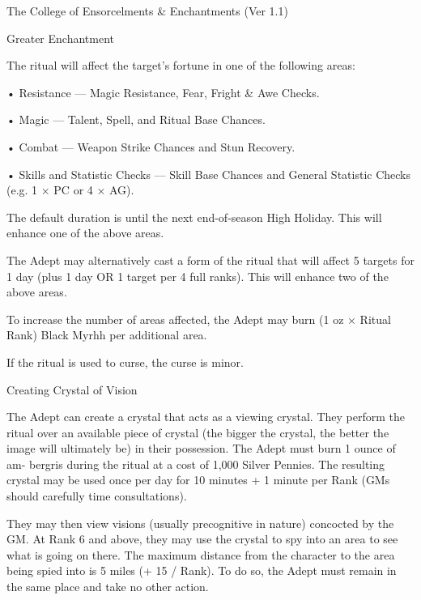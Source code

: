 \begin{Chapter}{The College of Ensorcelments \& Enchantments (Ver 1.1)}
\begin{ritual}[Q-1]{Greater Enchantment}
\begin{effects}
The ritual will affect the target’s fortune in one of 
the following areas:  

•  Resistance  —  Magic  Resistance,  Fear,  Fright  \& 
Awe Checks.  

• Magic — Talent, Spell, and Ritual Base Chances.  

•  Combat  —  Weapon  Strike  Chances  and  Stun 
Recovery.  

• Skills and Statistic Checks — Skill Base Chances 
and  General  Statistic  Checks  (e.g.  1  ×  PC  or  4  × 
AG). 

The default duration is until the next end-of-season High Holiday.
This will enhance one of the above areas.

The Adept may alternatively cast a form of the ritual that will affect
5 targets for 1 day (plus 1 day OR 1 target per 4 full ranks).  This
will enhance two of the above areas.

To increase the number of areas affected, the Adept may burn (1 oz ×
Ritual Rank) Black Myrhh per additional area.

If the ritual is used to curse, the curse is minor.
\end{effects}
\end{ritual}

\begin{ritual}[Q-2]{Creating Crystal of Vision }

\begin{effects}
The Adept can create a crystal that acts as a viewing crystal.  They
perform the ritual over an available piece of crystal (the bigger the
crystal, the better the image will ultimately be) in their possession.
The Adept must burn 1 ounce of am- bergris during the ritual at a cost
of 1,000 Silver Pennies.  The resulting crystal may be used once per
day for 10 minutes + 1 minute per Rank (GMs should carefully time
consultations).

They may then view visions (usually precognitive in nature) concocted
by the GM.  At Rank 6 and above, they may use the crystal to spy into
an area to see what is going on there.  The maximum distance from the
character to the area being spied into is 5 miles (+ 15 / Rank). To do
so, the Adept must remain in the same place and take no other action.


\end{effects}
\end{ritual}
\end{Chapter}
